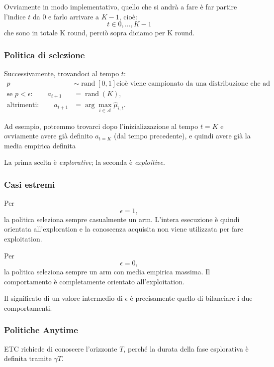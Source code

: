 Ovviamente in modo implementativo, quello che si andrà a fare è far partire l'indice $t$ da 0 e farlo arrivare a $K-1$, cioè:
\[
t \in {0,...,K-1}
\]
che sono in totale K round, perciò sopra diciamo per K round.
\subsubsection{Politica di selezione}

Successivamente, trovandoci al tempo $t$:
\begin{align*}
p &\sim \operatorname{rand}[0,1] \text{cioè viene campionato da una distribuzione che ad esempio può essere uniforme in 0,1}\\
\text{se }p<\epsilon:\qquad
a_{t+1}&=\operatorname{rand}(K),\\
\text{altrimenti}:\qquad
a_{t+1}
&=
\arg\max_{i\in\mathcal{A}}\widehat{\mu}_{i,t}.
\end{align*}
\begin{warning}{}
    Ad esempio, potremmo trovarci dopo l'inizializzazione al tempo $t = K$ e ovviamente avere già definito $a_{t = K}$ (dal tempo precedente), e quindi avere già la media empirica definita
\end{warning}

La prima scelta è \emph{explorative}; la seconda è \emph{exploitive}.

\subsubsection{Casi estremi}

Per
\[
\epsilon=1,
\]
la politica seleziona sempre casualmente un arm. L'intera esecuzione è quindi orientata all'exploration e la conoscenza acquisita non viene utilizzata per fare exploitation.

Per
\[
\epsilon=0,
\]
la politica seleziona sempre un arm con media empirica massima. Il comportamento è completamente orientato all'exploitation.

Il significato di un valore intermedio di $\epsilon$ è precisamente quello di bilanciare i due comportamenti.

\subsubsection{Politiche Anytime}

ETC richiede di conoscere l'orizzonte $T$, perché la durata della fase esplorativa è definita tramite $\gamma T$.

